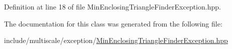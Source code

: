 Definition at line 18 of file Min\-Enclosing\-Triangle\-Finder\-Exception.\-hpp.



The documentation for this class was generated from the following file\-:\begin{DoxyCompactItemize}
\item 
include/multiscale/exception/\hyperlink{MinEnclosingTriangleFinderException_8hpp}{Min\-Enclosing\-Triangle\-Finder\-Exception.\-hpp}\end{DoxyCompactItemize}

